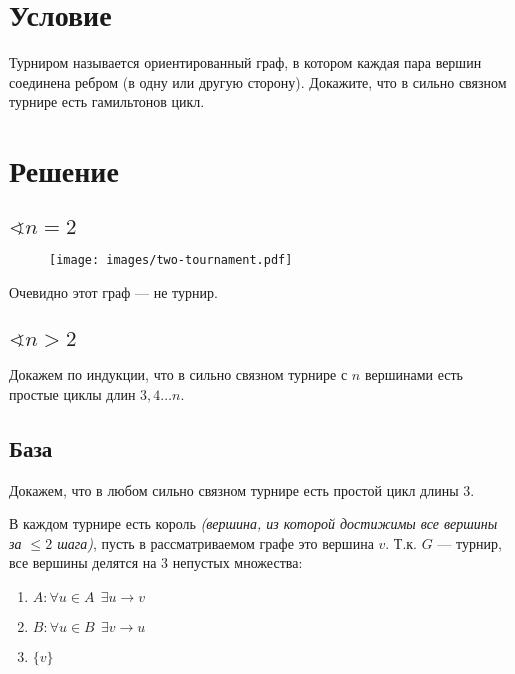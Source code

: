 

\usepackage{float}

\cfoot{}



\section*{Условие}

Турниром называется ориентированный граф, в котором каждая пара вершин соединена ребром (в одну или другую сторону). Докажите, что в сильно связном турнире есть гамильтонов цикл.

\section*{Решение}

\subsection*{$\sphericalangle n=2$}

\begin{figure}[h]
    \texttt{[image: images/two-tournament.pdf]}
    \centering
\end{figure}

Очевидно этот граф --- не турнир.

\subsection*{$\sphericalangle n>2$}

Докажем по индукции, что в сильно связном турнире с $n$ вершинами есть простые циклы длин $3, 4\ldots n$.

\subsection*{База}

Докажем, что в любом сильно связном турнире есть простой цикл длины $3$.

В каждом турнире есть король \textit{(вершина, из которой достижимы все вершины за $\le 2$ шага)}, пусть в рассматриваемом графе это вершина $v$. Т.к. $G$ --- турнир, все вершины делятся на 3 непустых множества:
\begin{enumerate}
    \item $A : \forall u\in A \ \ \exists u\to v$
    \item $B : \forall u\in B \ \ \exists v\to u$
    \item $\{v\}$
\end{enumerate}

